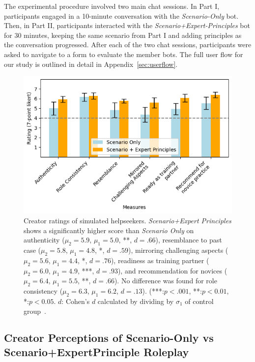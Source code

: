 The experimental procedure involved two main chat sessions. In Part I, participants engaged in a 10-minute conversation with the \textit{Scenario-Only} bot. Then, in Part II, participants interacted with the \textit{Scenario+Expert-Principles} bot for 30 minutes, keeping the same scenario from Part I and adding principles as the conversation progressed. After each of the two chat sessions, participants were asked to navigate to a form to evaluate the member bots. The full user flow for our study is outlined in detail in Appendix~\ref{sec:userflow}.

\begin{figure}
    \centering
    \includegraphics[width=\columnwidth]{figures/creatorstudy-comparison.png}
    \caption{Creator ratings of simulated helpseekers. \emph{Scenario+Expert Principles} shows a significantly higher score than \emph{Scenario Only} on authenticity ($\mu_2=5.9$, $\mu_1=5.0$, **, $d=.66$), resemblance to past case ($\mu_2=5.8$, $\mu_1=4.8$, *, $d=.59$), mirroring challenging aspects ($\mu_2=5.6$, $\mu_1=4.4$, *, $d=.76$), readiness as training partner ($\mu_2=6.0$, $\mu_1=4.9$, ***, $d=.93$), and recommendation for novices ($\mu_2=6.4$, $\mu_1=5.5$, **, $d=.66$). No difference was found for role consistency ($\mu_2=6.3$, $\mu_1=6.2$, $d=.13$). (***:$p<.001$, **:$p<0.01$, *:$p<0.05$. $d$: Cohen's $d$ calculated by dividing by $\sigma_1$ of control group~\cite{lakens2013calculating}.}
    \label{fig:creatorstudy-comparison}
\end{figure}

  
\subsection{Creator Perceptions of Scenario-Only vs Scenario+ExpertPrinciple Roleplay}

